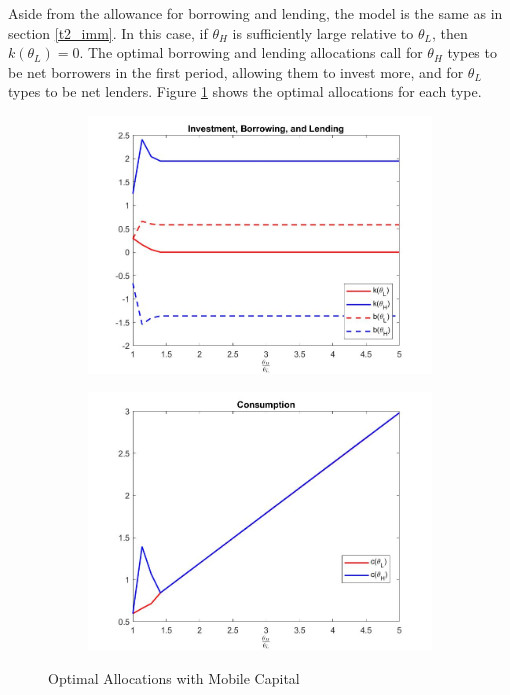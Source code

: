 \documentclass[11pt]{article}
\begin{document}
Aside from the allowance for borrowing and lending, the model is the same as in section \ref{t2_imm}. In this case, if \( \theta_H \) is sufficiently large relative to \( \theta_L \), then \( k(\theta_L) = 0 \). The optimal borrowing and lending allocations call for \( \theta_H \) types to be net borrowers in the first period, allowing them to invest more, and for \( \theta_L \) types to be net lenders. Figure \ref{fig_mob} shows the optimal allocations for each type. 

\begin{figure}[!ht]
    \centering
    \begin{subfigure}{0.49\textwidth}
        \centering
        \includegraphics[scale = 0.3]{figures/inv_mob.jpg}
    \end{subfigure}
    \hfill
    \begin{subfigure}{0.49\textwidth}
        \centering
        \includegraphics[scale = 0.3]{figures/cons_mob.jpg}
    \end{subfigure}
    \caption{Optimal Allocations with Mobile Capital}
    \label{fig_mob}
\end{figure}
\end{document}

